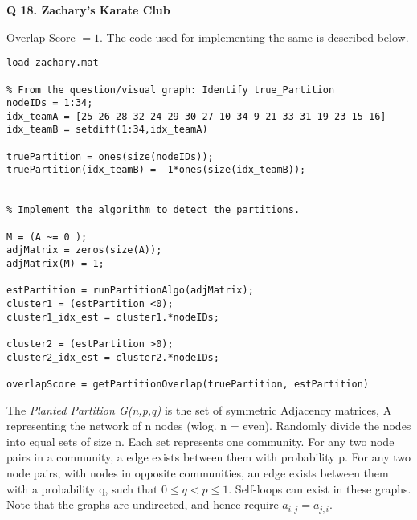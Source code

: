 \documentclass[9pt]{article}
\begin{document}
\hrulefill



\textbf{Q 18. Zachary's Karate Club}

Overlap Score $= 1$. The code used for implementing the same is described below.
\begin{lstlisting}
load zachary.mat

% From the question/visual graph: Identify true_Partition
nodeIDs = 1:34;
idx_teamA = [25 26 28 32 24 29 30 27 10 34 9 21 33 31 19 23 15 16]
idx_teamB = setdiff(1:34,idx_teamA)

truePartition = ones(size(nodeIDs));
truePartition(idx_teamB) = -1*ones(size(idx_teamB));


% Implement the algorithm to detect the partitions.

M = (A ~= 0 );
adjMatrix = zeros(size(A));
adjMatrix(M) = 1;

estPartition = runPartitionAlgo(adjMatrix);
cluster1 = (estPartition <0);
cluster1_idx_est = cluster1.*nodeIDs;

cluster2 = (estPartition >0);
cluster2_idx_est = cluster2.*nodeIDs;

overlapScore = getPartitionOverlap(truePartition, estPartition)

\end{lstlisting}

\hrulefill

The \emph{Planted Partition G(n,p,q)} is the set of symmetric Adjacency matrices, A representing the network of n nodes
(wlog. n = even). Randomly divide the nodes into equal sets of size n. Each set represents one community.
For any two node pairs in a community, a edge exists between them with probability p. For any two node pairs, with nodes in opposite communities, an edge exists between them with a probability q, such that $0 \leq q <  p \leq 1$. Self-loops can exist in these graphs. Note that the graphs are undirected, and hence require $a_{i,j} = a_{j,i}$.
\end{document}
